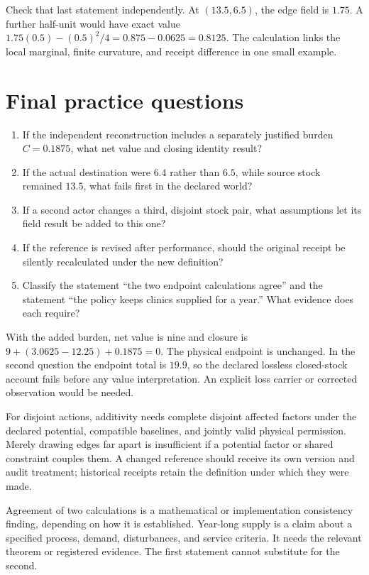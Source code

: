 Check that last statement independently. At \((13.5,6.5)\), the edge field is \(1.75\). A further half-unit would have exact value \(1.75(0.5)-(0.5)^2/4=0.875-0.0625=0.8125\). The calculation links the local marginal, finite curvature, and receipt difference in one small example.

\section{Final practice questions}

\begin{enumerate}
\item If the independent reconstruction includes a separately justified burden \(C=0.1875\), what net value and closing identity result?
\item If the actual destination were \(6.4\) rather than \(6.5\), while source stock remained \(13.5\), what fails first in the declared world?
\item If a second actor changes a third, disjoint stock pair, what assumptions let its field result be added to this one?
\item If the reference is revised after performance, should the original receipt be silently recalculated under the new definition?
\item Classify the statement ``the two endpoint calculations agree'' and the statement ``the policy keeps clinics supplied for a year.'' What evidence does each require?
\end{enumerate}

With the added burden, net value is nine and closure is \(9+(3.0625-12.25)+0.1875=0\). The physical endpoint is unchanged. In the second question the endpoint total is \(19.9\), so the declared lossless closed-stock account fails before any value interpretation. An explicit loss carrier or corrected observation would be needed.

For disjoint actions, additivity needs complete disjoint affected factors under the declared potential, compatible baselines, and jointly valid physical permission. Merely drawing edges far apart is insufficient if a potential factor or shared constraint couples them. A changed reference should receive its own version and audit treatment; historical receipts retain the definition under which they were made.

Agreement of two calculations is a mathematical or implementation consistency finding, depending on how it is established. Year-long supply is a claim about a specified process, demand, disturbances, and service criteria. It needs the relevant theorem or registered evidence. The first statement cannot substitute for the second.

